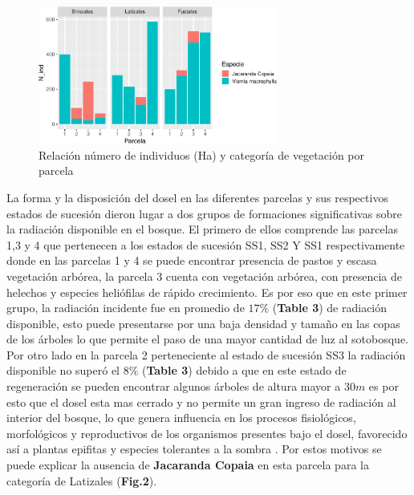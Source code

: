 \documentclass[letterpaper,9pt,onecolumn,twoside,]{pinp}
\begin{document}
\begin{figure}

{\centering \includegraphics[width=0.7\textwidth]{report_ecology_files/figure-latex/unnamed-chunk-10-1} 

}

\caption{Relación número de individuos (Ha) y categoría de vegetación por parcela}\label{fig:unnamed-chunk-10}
\end{figure}

La forma y la disposición del dosel en las diferentes parcelas y sus
respectivos estados de sucesión dieron lugar a dos grupos de formaciones
significativas sobre la radiación disponible en el bosque. El primero de
ellos comprende las parcelas 1,3 y 4 que pertenecen a los estados de
sucesión SS1, SS2 Y SS1 respectivamente donde en las parcelas 1 y 4 se
puede encontrar presencia de pastos y escasa vegetación arbórea, la
parcela 3 cuenta con vegetación arbórea, con presencia de helechos y
especies heliófilas de rápido crecimiento. Es por eso que en este primer
grupo, la radiación incidente fue en promedio de \(17 \%\)
(\textbf{Table 3}) de radiación disponible, esto puede presentarse por
una baja densidad y tamaño en las copas de los árboles\citep{plateros}
lo que permite el paso de una mayor cantidad de luz al sotobosque. Por
otro lado en la parcela 2 perteneciente al estado de sucesión SS3 la
radiación disponible no superó el \(8 \%\) (\textbf{Table 3}) debido a
que en este estado de regeneración se pueden encontrar algunos árboles de
altura mayor a \(30 m\) es por esto que el dosel esta mas cerrado y no
permite un gran ingreso de radiación al interior del bosque, lo que
genera influencia en los procesos fisiológicos, morfológicos y
reproductivos de los organismos presentes bajo el dosel, favorecido así
a plantas epifitas y especies tolerantes a la sombra \citep{plateros}.
Por estos motivos se puede explicar la ausencia de \textbf{Jacaranda
Copaia} en esta parcela para la categoría de Latizales (\textbf{Fig.2}).
\end{document}
